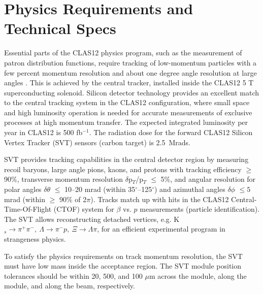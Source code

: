 \section{Physics Requirements and Technical Specs}
Essential parts of the CLAS12 physics program, such as the measurement of patron distribution functions, require tracking of low-momentum  particles with a few percent momentum resolution and about one degree angle resolution at large angles \cite{TDR12}. This is achieved by the central tracker, installed inside the CLAS12 5 T superconducting solenoid.
Silicon detector technology provides an excellent match to the central tracking system in the CLAS12 configuration, where small space and high luminosity operation is needed for accurate measurements of exclusive processes at high momentum transfer. The expected integrated luminosity per year in CLAS12 is 500 fb$^{-1}$. The radiation dose for the forward CLAS12 Silicon Vertex Tracker (SVT) sensors (carbon target) is 2.5~Mrads.

SVT provides tracking capabilities in the central detector region by measuring recoil baryons, large angle pions,  kaons, and protons with tracking efficiency $\ge$ 90$\%$, transverse momentum resolution $\delta$p$_{T}$/p$_{T}$ $\le$ 5$\%$, and angular resolution for polar angles $\delta$$\theta$ $\le$ 10--20 mrad (within 35$^\circ$--125$^\circ$) and azimuthal angles $\delta$$\phi$ $\le5$ mrad (within $\ge$ 90$\%$ of 2$\pi$). Tracks match up with hits in the CLAS12 Central-Time-Of-Flight (CTOF) system for $\beta$ vs. $p$ measurements (particle identification). The SVT allows reconstructing detached vertices, e.g. K$_{s}\!\to\!\pi^{+}\pi^{-},~\Lambda\!\to\!\pi^{-}p,~\Xi\!\to\!\Lambda\pi$, for an efficient experimental program in strangeness physics.  


To satisfy the physics requirements on track momentum resolution, the SVT must have low mass inside the acceptance region. The SVT module position tolerances should be within 20, 500, and 100 $\mu$m across the module, along the module, and along the beam, respectively.
